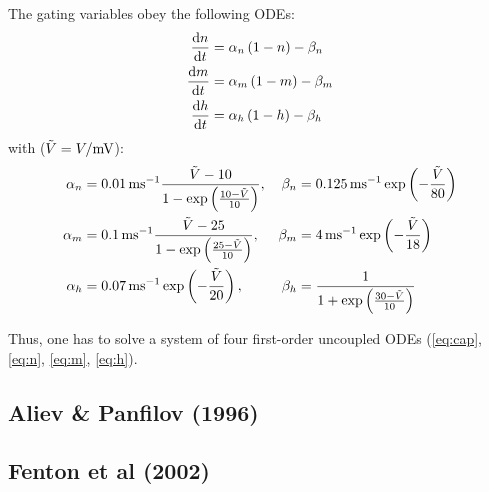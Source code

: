 The gating variables obey the following ODEs:
\begin{subequations}
\begin{align}
    \dv{n}{t}&=\alpha_{n}\,(1-n)-\beta_{n} \label{eq:n} \\
    \dv{m}{t}&=\alpha_{m}\,(1-m)-\beta_{m} \label{eq:m} \\
    \dv{h}{t}&=\alpha_{h}\,(1-h)-\beta_{h} \label{eq:h}
\end{align}
\end{subequations}
with ($\tilde{V}=V/\si{\milli\volt}$):
\begin{align*}
    \alpha_{n}&=\SI{.01}{\per\milli\second}
        \frac{\tilde{V}-10}{1-
            \exp\left(\frac{10-\tilde{V}}{10}\right)},&
    \beta_{n}&=\SI{.125}{\per\milli\second}
        \exp\left(-\frac{\tilde{V}}{80}\right) \\
    \alpha_{m}&=\SI{.1}{\per\milli\second}
        \frac{\tilde{V}-25}{1-
            \exp\left(\frac{25-\tilde{V}}{10}\right)},&
    \beta_{m}&=\SI{4}{\per\milli\second}
        \exp\left(-\frac{\tilde{V}}{18}\right) \\
    \alpha_{h}&=\SI{.07}{\per\milli\second}
        \exp\left(-\frac{\tilde{V}}{20}\right),&
    \beta_{h}&=\frac{1}{1+
        \exp\left(\frac{30-\tilde{V}}{10}\right)}
\end{align*}

Thus, one has to solve a system of four first-order uncoupled ODEs
(\ref{eq:cap}, \ref{eq:n}, \ref{eq:m}, \ref{eq:h}).


\subsection{Aliev \& Panfilov (1996)}


\subsection{Fenton et al (2002)}


